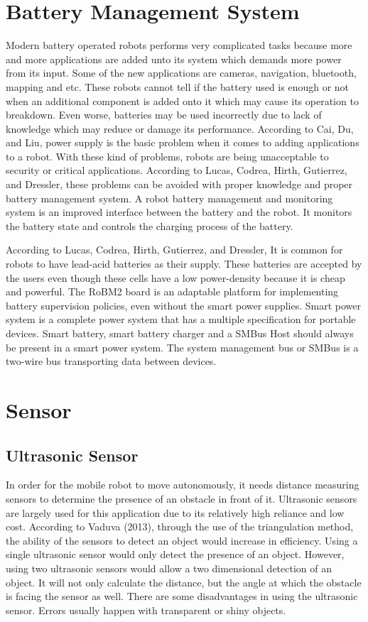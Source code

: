 \section{ Battery Management System}

	Modern battery operated robots performs very complicated tasks because more and more applications are added unto its system which demands more power from its input. Some of the new applications are cameras, navigation, bluetooth, mapping and etc. These robots cannot tell if the battery used is enough or not when an additional component is added onto it which may cause its operation to breakdown. Even worse, batteries may be used incorrectly due to lack of knowledge which may reduce or damage its performance. According to Cai, Du, and Liu, power supply is the basic problem when it comes to adding applications to a robot. With these kind of problems, robots are being unacceptable to security or critical applications. According to Lucas, Codrea, Hirth, Gutierrez, and Dressler, these problems can be avoided with proper knowledge and proper battery management system. A robot battery management and monitoring system is an improved interface between the battery and the robot. It monitors the battery state and controls the charging process of the battery.

	According to Lucas, Codrea, Hirth, Gutierrez, and Dressler, It is common for robots to have lead-acid batteries as their supply. These batteries are accepted by the users even though these cells have a low power-density because it is cheap and powerful. The RoBM2 board is an adaptable platform for implementing battery supervision policies, even without the smart power supplies. Smart power system is a complete power system that has a multiple specification for portable devices. Smart battery, smart battery charger and a SMBus Host should always be present in a smart power system. The system management bus or SMBus is a two-wire bus transporting data between devices.
	
 \section{Sensor}     
	
\subsection{Ultrasonic Sensor}
    
	In order for the mobile robot to move autonomously, it needs distance measuring sensors to determine the presence of an obstacle in front of it. Ultrasonic sensors are largely used for this application due to its relatively high reliance and low cost. According to Vaduva (2013), through the use of the triangulation method, the ability of the sensors to detect an object would increase in efficiency. Using a single ultrasonic sensor would only detect the presence of an object. However, using two ultrasonic sensors would allow a two dimensional detection of an object. It will not only calculate the distance, but the angle at which the obstacle is facing the sensor as well. There are some disadvantages in using the ultrasonic sensor. Errors usually happen with transparent or shiny objects. 

